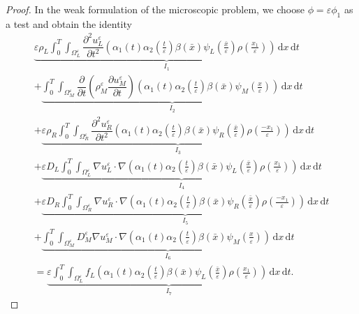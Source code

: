 \documentclass[10pt,a4paper]{amsart}
\newcommand{\B}{\textcolor{orange}}
\newcommand{\di}[1]{\,\mathrm{d}#1}
\def\es{\varepsilon}
\def\oll{\Omega_L^\varepsilon}
\def\omm{\Omega_M^\varepsilon}
\def\orr{\Omega_R^\varepsilon}
\begin{document}
\begin{proof}
In the weak formulation of the microscopic problem, we choose $\phi=\es\phi_1$ as a test and obtain the identity
 \begin{multline}\label{eq:phi1weakform}
   \underbrace{ \es \rho_L\int_0^T\int_{\oll}  \dfrac{\partial^2u_L^\es}{\partial t^2} (\alpha_1(t)\alpha_2(\frac{t}{\es})\beta(\bar x) \psi_L(\frac{\bar x}{\es})\rho(\frac{x_1}{\es}))\di{x}\di{t}}_{I_1}\\
    +  \underbrace{\int_0^T\int_{\omm}  \dfrac{\partial}{\partial t}\left({\rho_M^\es} \dfrac{\partial u_M^\es}{\partial t}\right) ( \alpha_1(t)\alpha_2(\frac{t}{\es})\beta(\bar x) \psi_M(\frac{x}{\es}))\di{x}\di{t}}_{I_2} \\
    +   \underbrace{ \es \rho_R\int_0^T\int_{\orr} \dfrac{\partial^2u_R^\es}{\partial t^2} ( \alpha_1(t)\alpha_2(\frac{t}{\es})\beta(\bar x) \psi_R(\frac{\bar x}{\es})\rho(\frac{-x_1}{\es}))\di{x}\di{t}}_{I_3}\\
    +\underbrace{\es D_L\int_0^T\int_{\oll}\nabla u_L^\es \cdot \nabla ( \alpha_1(t)\alpha_2(\frac{t}{\es})\beta(\bar x) \psi_L(\frac{\bar x}{\es})\rho(\frac{x_1}{\es}))   \di{x}\di{t}}_{I_4}\\
    + \underbrace{\es D_R\int_0^T\int_{\orr} \nabla u_R^\es\cdot\nabla ( \alpha_1(t)\alpha_2(\frac{t}{\es})\beta(\bar x) \psi_R(\frac{\bar x}{\es})\rho(\frac{-x_1}{\es})) \di{x}\di{t}}_{I_5} \\
    +\underbrace{ \int_0^T\int_{\omm}  D_M^\es  \nabla u_M^\es\cdot\nabla (\alpha_1(t)\alpha_2(\frac{t}{\es})\beta(\bar x) \psi_M(\frac{x}{\es})) \di{x}\di{t}}_{I_6}\\
    = \underbrace{\es \int_0^T\int_{\oll} f_L(\alpha_1(t)\alpha_2(\frac{t}{\es})\beta(\bar x) \psi_L(\frac{\bar x}{\es})\rho(\frac{x_1}{\es})) \di{x}\di{t}}_{I_7}.

\end{multline}
\end{proof}
\end{document}
